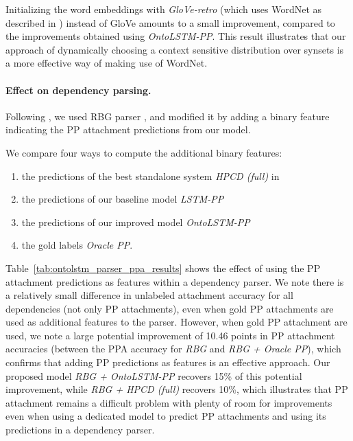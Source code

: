 Initializing the word embeddings with \textit{GloVe-retro} (which uses WordNet as described in \cite{faruqui:15}) instead of GloVe amounts to a small improvement, compared to the improvements obtained using \textit{OntoLSTM-PP}.
This result illustrates that our approach of dynamically choosing a context sensitive distribution over synsets is a more effective way of making use of WordNet.


\paragraph{Effect on dependency parsing.} Following \cite{belinkov2014exploring}, we used RBG parser \citep{lei2014low}, and modified it by adding a binary feature indicating the PP attachment predictions from our model. 

We compare four ways to compute the additional binary features:
\begin{enumerate}
	\item the predictions of the best standalone system \textit{HPCD (full)} in \cite{belinkov2014exploring}
	\item the predictions of our baseline model \textit{LSTM-PP}
	\item the predictions of our improved model \textit{OntoLSTM-PP}
	\item the gold labels \textit{Oracle PP}.
\end{enumerate}

Table~\ref{tab:ontolstm_parser_ppa_results} shows the effect of using the PP attachment predictions as features within a dependency parser. 
We note there is a relatively small difference in unlabeled attachment accuracy for all dependencies (not only PP attachments), even when gold PP attachments are used as additional features to the parser.
However, when gold PP attachment are used, we note a large potential improvement of 10.46 points in PP attachment accuracies (between the PPA accuracy for \textit{RBG} and \textit{RBG + Oracle PP}), which confirms that adding PP predictions as features is an effective approach. 
Our proposed model \textit{RBG + OntoLSTM-PP} recovers 15\% of this potential improvement, while \textit{RBG + HPCD (full)} recovers 10\%, which illustrates that PP attachment remains a difficult problem with plenty of room for improvements even when using a dedicated model to predict PP attachments and using its predictions in a dependency parser.

